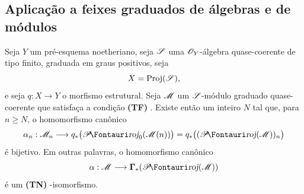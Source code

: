\subsection{Aplicação a feixes graduados de álgebras e de módulos}
\label{subsection:III.2.3}

\begin{theorem}[2.3.1]
\label{III.2.3.1}
Seja $Y$ um pré-esquema noetheriano, seja $\mathscr{S}$ uma $\mathscr{O}_Y$-álgebra quase-coerente de tipo finito, graduada em graus positivos, seja
\[
  X=\operatorname{Proj}(\mathscr{S}),
\]
e seja $q:X\to Y$ o morfismo estrutural.
Seja $\mathscr{M}$ um $\mathscr{S}$-módulo graduado quase-coerente que satisfaça a condição \textbf{(TF) }.
Existe então um inteiro $N$ tal que, para $n\geq N$, o homomorfismo canônico 
\[
  \alpha_n:\sh{M}_n
  \longrightarrow q_*\bigl(\shProj_0(\sh{M}(n))\bigr)
  =q_*\bigl((\shProj(\sh{M}))_n\bigr)
\]
é bijetivo.
Em outras palavras, o homomorfismo canônico
\[
  \alpha:\sh{M}\longrightarrow\bbGamma_*(\shProj(\sh{M}))
\]
é um \textbf{(TN) }-isomorfismo.
\end{theorem}

